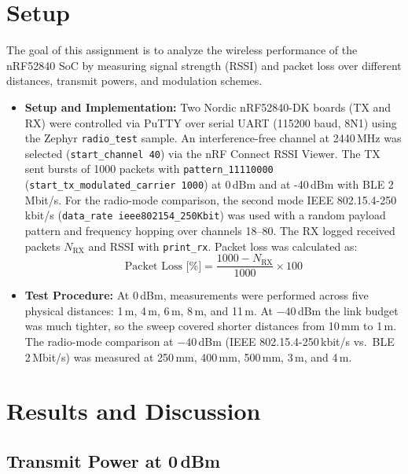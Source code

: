 
\section{Setup}

The goal of this assignment is to analyze the wireless performance of the nRF52840 SoC by measuring signal strength (RSSI) and packet loss over different distances, transmit powers, and modulation schemes.

\begin{itemize}
    \item \textbf{Setup and Implementation:}
    Two Nordic nRF52840-DK boards (TX and RX) were controlled via PuTTY over serial UART (115200 baud, 8N1) using the Zephyr \texttt{radio\_test} sample. An interference-free channel at 2440\,MHz was selected (\texttt{start\_channel 40}) via the nRF Connect RSSI Viewer. The TX sent bursts of 1000 packets with \texttt{pattern\_11110000} (\texttt{start\_tx\_modulated\_carrier 1000}) at 0\,dBm and at -40\,dBm with BLE 2\,Mbit/s. For the radio-mode comparison, the second mode IEEE 802.15.4-250\,kbit/s (\texttt{data\_rate ieee802154\_250Kbit}) was used with a random payload pattern and frequency hopping over channels 18--80. The RX logged received packets $N_{\text{RX}}$ and RSSI with \texttt{print\_rx}. Packet loss was calculated as:
    \begin{equation}
        \text{Packet Loss [\%]} = \frac{1000 - N_{\text{RX}}}{1000} \times 100
    \end{equation}

    \item \textbf{Test Procedure:}
    At 0\,dBm, measurements were performed across five physical distances: 1\,m, 4\,m, 6\,m, 8\,m, and 11\,m.
    At $-40$\,dBm the link budget was much tighter, so the sweep covered shorter distances from 10\,mm to 1\,m.
    The radio-mode comparison at $-40$\,dBm (IEEE 802.15.4-250\,kbit/s vs.\ BLE 2\,Mbit/s) was measured
    at 250\,mm, 400\,mm, 500\,mm, 3\,m, and 4\,m.
\end{itemize}

\section{Results and Discussion}

\subsection{Transmit Power at 0\,dBm}


